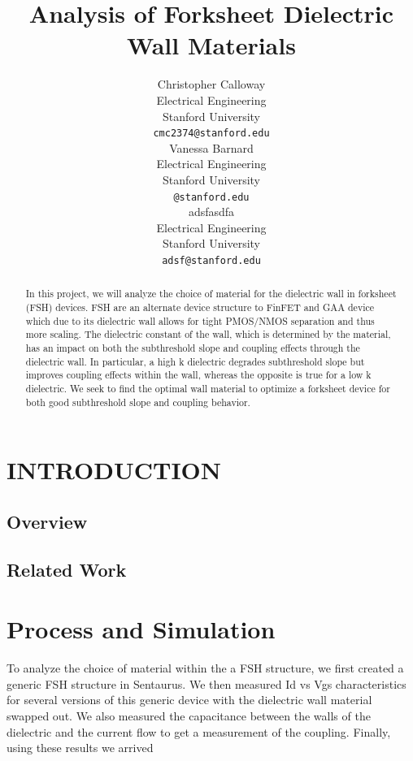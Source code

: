\documentclass[letterpaper, 12 pt, conference]{ieeeconf}  %
\title{\LARGE \bf
Analysis of Forksheet Dielectric Wall Materials
}
\author{ \parbox{3 in}{\centering Christopher Calloway \\
        Electrical Engineering\\
        Stanford University\\
        {\tt\small cmc2374@stanford.edu}}
        \hspace*{ 0.5 in}
        \parbox{3 in}{ \centering Vanessa Barnard\\
        Electrical Engineering \\
        Stanford University\\
        {\tt\small @stanford.edu}}
          \hspace*{ 0.5 in}
        \parbox{3 in}{ \centering adsfasdfa\\
        Electrical Engineering \\
        Stanford University\\
        {\tt\small adsf@stanford.edu}}
}
\begin{document}
\maketitle
\thispagestyle{empty}
\pagestyle{empty}


\begin{abstract}

In this project, we will analyze the choice of material for the dielectric wall in forksheet (FSH) devices. FSH are an alternate device structure to FinFET and GAA device which due to its dielectric wall allows for tight PMOS/NMOS separation and thus more scaling. The dielectric constant of the wall, which is determined by the material, has an impact on both the subthreshold slope and coupling effects through the dielectric wall. In particular, a high k dielectric degrades subthreshold slope but improves coupling effects within the wall, whereas the opposite is true for a low k dielectric. We seek to find the optimal wall material to optimize a forksheet device for both good subthreshold slope and coupling behavior. 


\end{abstract}


\section{INTRODUCTION}

\subsection{Overview}






\subsection{Related Work}




\section{Process and Simulation}

To analyze the choice of material within the a FSH structure, we first created a generic FSH structure in Sentaurus. We then measured Id vs Vgs characteristics for several versions of this generic device with the dielectric wall material swapped out. We also measured the capacitance between the walls of the dielectric and the current flow to get a measurement of the coupling. Finally, using these results we arrived 
\end{document}
